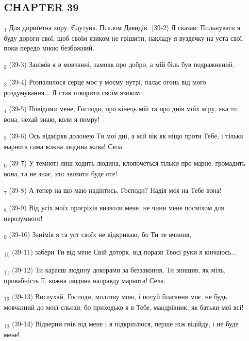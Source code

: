 \subsection{CHAPTER 39}
\begin{tcolorbox}
\textsubscript{1} Для дириґетна хору. Єдутуна. Псалом Давидів. (39-2) Я сказав: Пильнувати я буду дороги свої, щоб своїм язиком не грішити, накладу я вуздечку на уста свої, поки передо мною безбожний.
\end{tcolorbox}
\begin{tcolorbox}
\textsubscript{2} (39-3) Занімів я в мовчанні, замовк про добро, а мій біль був подражнений.
\end{tcolorbox}
\begin{tcolorbox}
\textsubscript{3} (39-4) Розпалилося серце моє у моєму нутрі, палає огонь від мого роздумування... Я став говорити своїм язиком:
\end{tcolorbox}
\begin{tcolorbox}
\textsubscript{4} (39-5) Повідоми мене, Господи, про кінець мій та про днів моїх міру, яка то вона, нехай знаю, коли я помру!
\end{tcolorbox}
\begin{tcolorbox}
\textsubscript{5} (39-6) Ось відміряв долонею Ти мої дні, а мій вік як ніщо проти Тебе, і тільки марнота сама кожна людина жива! Села.
\end{tcolorbox}
\begin{tcolorbox}
\textsubscript{6} (39-7) У темноті лиш ходить людина, клопочеться тільки про марне: громадить вона, та не знає, хто звозити буде оте!
\end{tcolorbox}
\begin{tcolorbox}
\textsubscript{7} (39-8) А тепер на що маю надіятись, Господи? Надія моя на Тебе вона!
\end{tcolorbox}
\begin{tcolorbox}
\textsubscript{8} (39-9) Від усіх моїх прогріхів визволи мене, не чини мене посміхом для нерозумного!
\end{tcolorbox}
\begin{tcolorbox}
\textsubscript{9} (39-10) Занімів я та уст своїх не відкриваю, бо Ти те вчинив,
\end{tcolorbox}
\begin{tcolorbox}
\textsubscript{10} (39-11) забери Ти від мене Свій доторк, від порази Твоєї руки я кінчаюсь...
\end{tcolorbox}
\begin{tcolorbox}
\textsubscript{11} (39-12) Ти караєш людину докорами за беззаконня, Ти знищив, як міль, привабність її, кожна людина направду марнота! Села.
\end{tcolorbox}
\begin{tcolorbox}
\textsubscript{12} (39-13) Вислухай, Господи, молитву мою, і почуй благання моє, не будь мовчазний до моєї сльози, бо приходько я в Тебе, мандрівник, як батьки мої всі!
\end{tcolorbox}
\begin{tcolorbox}
\textsubscript{13} (39-14) Відверни гнів від мене і я підкріплюся, перше ніж відійду, і не буде мене!
\end{tcolorbox}
